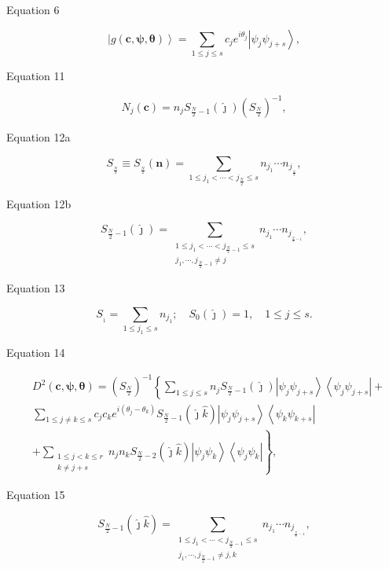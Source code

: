 \documentclass[aps]{revtex4}%
\begin{document}
Equation 6%

\[
\left\vert g\left(  \boldsymbol{c},\boldsymbol{\psi},\boldsymbol{\theta
}\right)  \right\rangle =\sum_{1\leq j\leq s}c_{j}e^{i\theta_{j}}\left\vert
\psi_{j}\psi_{j+s}\right\rangle ,
\]


Equation 11%

\[
N_{j}\left(  \boldsymbol{c}\right)  =n_{j}S_{\frac{N}{2}-1}\left(  \hat
{\jmath}\right)  \left(  S_{\frac{N}{2}}\right)  ^{-1},
\]


Equation 12a%

\[
S_{_{\frac{N}{2}}}\equiv S_{_{\frac{N}{2}}}\left(  \boldsymbol{n}\right)
=\sum_{1\leq j_{1}<\cdots<j_{\frac{N}{2}}\leq s}n_{j_{1}}\cdots n_{j_{_{\frac
{N}{2}}}},
\]


Equation 12b%

\[
S_{\frac{N}{2}-1}\left(  \hat{\jmath}\right)  =\sum_{\substack{1\leq
j_{1}<\cdots<j_{\frac{N}{2}-1}\leq s\\j_{1},\cdots,j_{\frac{N}{2}-1}\neq
j}}n_{j_{1}}\cdots n_{j_{_{\frac{N}{2}-1}}},
\]


Equation 13%

\[
S_{_{1}}=\sum_{1\leq j_{1}\leq s}n_{j_{1}};\quad S_{0}\left(  \hat{\jmath
}\right)  =1,\quad1\leq j\leq s.
\]


Equation 14%

\begin{align*}
&  D^{2}\left(  \boldsymbol{c},\boldsymbol{\psi},\boldsymbol{\theta}\right)
=\left(  S_{\frac{N}{2}}\right)  ^{-1}\left\{  \sum_{1\leq j\leq s}%
n_{j}S_{\frac{N}{2}-1}\left(  \hat{\jmath}\right)  \left\vert \psi_{j}%
\psi_{j+s}\right\rangle \left\langle \psi_{j}\psi_{j+s}\right\vert +\right. \\
&  \sum_{1\leq j\neq k\leq s}c_{j}c_{k}e^{i\left(  \theta_{j}-\theta
_{k}\right)  }S_{\frac{N}{2}-1}\left(  \hat{\jmath}\hat{k}\right)  \left\vert
\psi_{j}\psi_{j+s}\right\rangle \left\langle \psi_{k}\psi_{k+s}\right\vert \\
&  \left.  +\sum_{\substack{1\leq j<k\leq r\\k\neq j+s}}n_{j}n_{k}S_{\frac
{N}{2}-2}\left(  \hat{\jmath}\hat{k}\right)  \left\vert \psi_{j}\psi
_{k}\right\rangle \left\langle \psi_{j}\psi_{k}\right\vert \right\}  ,
\end{align*}


Equation 15%

\[
S_{\frac{N}{2}-1}\left(  \hat{\jmath}\hat{k}\right)  =\sum_{\substack{1\leq
j_{1}<\cdots<j_{\frac{N}{2}-1}\leq s\\j_{1},\cdots,j_{\frac{N}{2}-1}\neq
j,k}}n_{j_{1}}\cdots n_{j_{_{\frac{N}{2}-1}}},
\]
\end{document}
